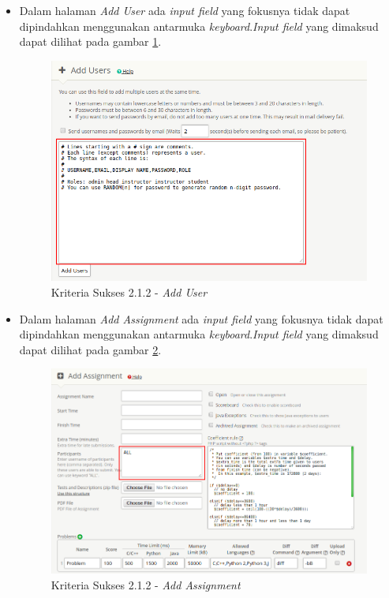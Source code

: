 \documentclass[a4paper,twoside]{article}
\begin{document}
\begin{enumerate}
\begin{itemize}
			\item Dalam halaman \textit{Add User} ada \textit{input field} yang fokusnya tidak dapat dipindahkan menggunakan antarmuka \textit{keyboard}.\textit{Input field} yang dimaksud dapat dilihat pada gambar \ref{fig:kepatuhan_2_1_2_add_user}.
			\begin{figure}[H]
				\centering  
				\includegraphics[scale=0.5]{kepatuhan_2_1_2_add_user}  
				\caption[Kriteria Sukses 2.1.2 - \textit{Add User}]{Kriteria Sukses 2.1.2 - \textit{Add User}} 
				\label{fig:kepatuhan_2_1_2_add_user} 
			\end{figure}
			
			\item Dalam halaman \textit{Add Assignment} ada \textit{input field} yang fokusnya tidak dapat dipindahkan menggunakan antarmuka \textit{keyboard}.\textit{Input field} yang dimaksud dapat dilihat pada gambar \ref{fig:kepatuhan_2_1_2_add_assignment}.
			\begin{figure}[H]
				\centering  
				\includegraphics[scale=0.5]{kepatuhan_2_1_2_add_assignment}  
				\caption[Kriteria Sukses 2.1.2 - \textit{Add Assignment}]{Kriteria Sukses 2.1.2 - \textit{Add Assignment}} 
				\label{fig:kepatuhan_2_1_2_add_assignment} 
			\end{figure}
			

\end{itemize}
\end{enumerate}
\end{document}
